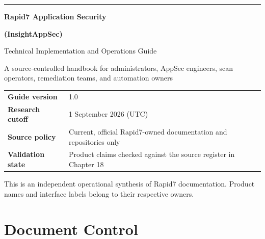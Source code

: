 \documentclass[11pt,letterpaper,oneside]{scrreprt}
\begin{document}
\hypersetup{pageanchor=false}

\begin{titlepage}
\pagecolor{R7Navy}
\color{white}
\vspace*{0.55in}
{\color{R7Orange}\rule{1.1in}{5pt}}\par
\vspace{0.35in}
{\fontsize{34}{39}\selectfont\bfseries Rapid7 Application Security\par}
\vspace{0.08in}
{\fontsize{25}{30}\selectfont\bfseries (InsightAppSec)\par}
\vspace{0.32in}
{\fontsize{19}{24}\selectfont Technical Implementation and Operations Guide\par}
\vspace{0.5in}
{\large A source-controlled handbook for administrators, AppSec engineers, scan operators, remediation teams, and automation owners\par}
\vfill
\begin{tabular}{@{}P{1.6in}P{4.6in}@{}}
\color{R7Orange}\bfseries Guide version & 1.0\\
\color{R7Orange}\bfseries Research cutoff & 1 September 2026 (UTC)\\
\color{R7Orange}\bfseries Source policy & Current, official Rapid7-owned documentation and repositories only\\
\color{R7Orange}\bfseries Validation state & Product claims checked against the source register in Chapter 18\\
\end{tabular}
\par
\vspace{0.45in}
{\small This is an independent operational synthesis of Rapid7 documentation. Product names and interface labels belong to their respective owners.}\par
\end{titlepage}
\nopagecolor
\color{black}
\hypersetup{pageanchor=true}

\chapter*{Document Control}
\end{document}
